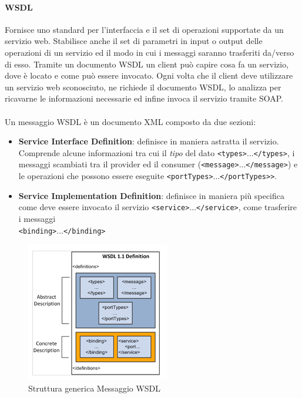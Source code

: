 \documentclass{article}
\newcommand*{\xml}[1]{\texttt{<#1>}}
\begin{document}
\paragraph{WSDL}
Fornisce uno standard per l'interfaccia e il set di operazioni supportate da un servizio web. Stabilisce anche il set di parametri in input o output delle operazioni di un servizio ed il modo in cui i messaggi saranno trasferiti da/verso di esso. Tramite un documento WSDL un client può capire cosa fa un servizio, dove è locato e come può essere invocato. Ogni volta che il client deve utilizzare un servizio web sconosciuto, ne richiede il documento WSDL, lo analizza per ricavarne le informazioni necessarie ed infine invoca il servizio tramite SOAP.
\\ \\
Un messaggio WSDL è un documento XML composto da due sezioni:
\begin{itemize}
    \item \textbf{Service Interface Definition}: definisce in maniera astratta il servizio. Comprende alcune informazioni tra cui il \textit{tipo} del dato \xml{types}...\xml{/types}, i messaggi scambiati tra il provider ed il consumer (\xml{message}...\xml{/message}) e le operazioni che possono essere eseguite \xml{portTypes}...\xml{/portTypes>}.
    \item \textbf{Service Implementation Definition}: definisce in maniera più specifica come deve essere invocato il servizio \xml{service}...\xml{/service}, come trasferire i messaggi\\ \xml{binding}...\xml{/binding}
\end{itemize}

\begin{figure}[H]
\centering
\includegraphics{img/WSDLMessage.png}
\caption{Struttura generica Messaggio WSDL}
\end{figure}
\end{document}

